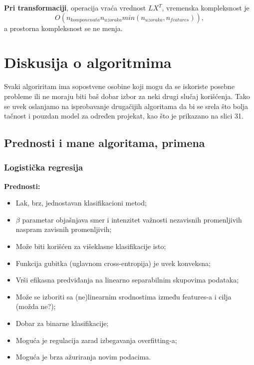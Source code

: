 \documentclass[fontsize=12bp, paper=a4]{scrarticle}
\begin{document}
\textbf{Pri transformaciji}, operacija vraća vrednost $LX^T$, vremenska kompleksnost je 
$$O(n_{komponenata} n_{uzoraka} min(n_{uzoraka}, n_{features})),$$ 
a prostorna kompleksnost se ne menja. 


\newpage


\section{Diskusija o algoritmima}
Svaki algoriritam ima sopostvene osobine koji mogu da se iskoriste posebne probleme ili ne moraju biti baš dobar izbor za neki drugi slučaj korišćenja. Tako se uvek oslanjamo na isprobavanje drugačijih algoritama da bi se srela što bolja tačnost i pouzdan model za određen projekat, kao što je prikazano na slici 31.\cite{comparison}\cite{comp1a}\cite{comp1b}\cite{comp2}\cite{comp3}\cite{comp4}
\vbox{}

\subsection{Prednosti i mane algoritama, primena}
\subsubsection{Logistička regresija}

\textbf{Prednosti:}
\begin{itemize}
    \item Lak, brz, jednostavan klasifikacioni metod;
    \item $\beta$ parametar objašnjava smer i intenzitet važnosti nezavisnih promenljivih naspram zavisnih promenljivih;
    \item Može biti korišćen za višeklasne klasifikacije isto;
    \item Funkcija gubitka (uglavnom cross-entropija) je uvek konveksna;
    \item Vrši efikasna predviđanja na linearno separabilnim skupovima podataka;
    \item Može se izboriti sa (ne)linearnim srodnostima između features-a i cilja (možda ne?);
    \item Dobar za binarne klasifikacije;
    \item Moguća je regulacija zarad izbegavanja overfitting-a;
    \item Moguća je brza ažuriranja novim podacima.
\end{itemize}
\end{document}
